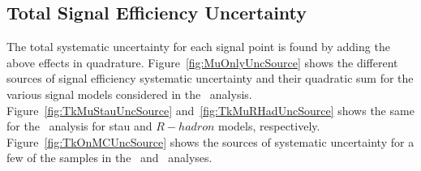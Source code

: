 \subsection{Total Signal Efficiency Uncertainty}

The total systematic uncertainty for each signal point is found by adding the above effects in quadrature.
Figure~\ref{fig:MuOnlyUncSource} shows the different sources of signal efficiency systematic uncertainty and their quadratic sum
for the various signal models considered in the \muononly\ analysis.
Figure~\ref{fig:TkMuStauUncSource} and~\ref{fig:TkMuRHadUncSource} shows the same for the \tktof\ analysis for stau and $R-hadron$ models, respectively.
Figure~\ref{fig:TkOnMCUncSource} shows the sources of systematic uncertainty for a few of the samples in the \tkonly\ and \multi\ analyses.

